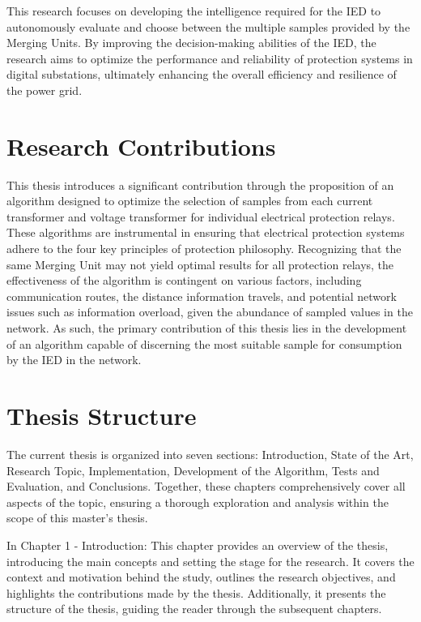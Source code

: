 This research focuses on developing the intelligence required for the IED to autonomously evaluate and choose between the multiple samples provided by the Merging Units. By improving the decision-making abilities of the IED, the research aims to optimize the performance and reliability of protection systems in digital substations, ultimately enhancing the overall efficiency and resilience of the power grid.

\section{Research Contributions}
This thesis introduces a significant contribution through the proposition of an algorithm designed to optimize the selection of samples from each current transformer and voltage transformer for individual electrical protection relays. These algorithms are instrumental in ensuring that electrical protection systems adhere to the four key principles of protection philosophy. Recognizing that the same Merging Unit may not yield optimal results for all protection relays, the effectiveness of the algorithm is contingent on various factors, including communication routes, the distance information travels, and potential network issues such as information overload, given the abundance of sampled values in the network. As such, the primary contribution of this thesis lies in the development of an algorithm capable of discerning the most suitable sample for consumption by the IED in the network.

\section{Thesis Structure}

The current thesis is organized into seven sections: Introduction, State of the Art, Research Topic, Implementation, Development of the Algorithm, Tests and Evaluation, and Conclusions. Together, these chapters comprehensively cover all aspects of the topic, ensuring a thorough exploration and analysis within the scope of this master's thesis.

In Chapter 1 - Introduction: This chapter provides an overview of the thesis, introducing the main concepts and setting the stage for the research. It covers the context and motivation behind the study, outlines the research objectives, and highlights the contributions made by the thesis. Additionally, it presents the structure of the thesis, guiding the reader through the subsequent chapters.

